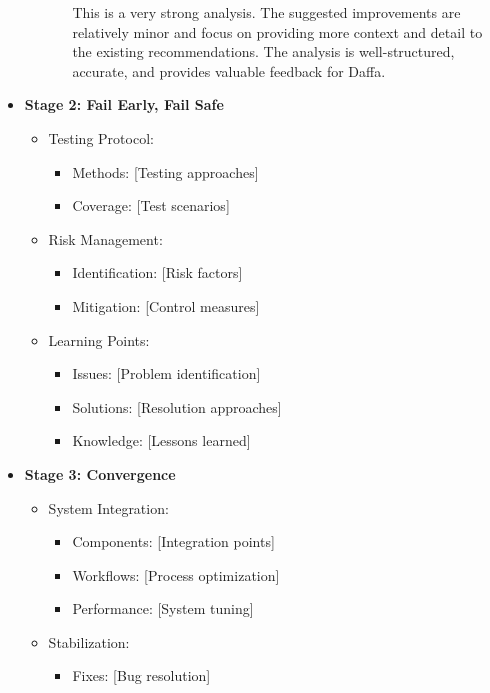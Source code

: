 \documentclass{article}
\begin{document}
\begin{itemize}
\begin{itemize}
\begin{itemize}
This is a very strong analysis. The suggested improvements are relatively minor and focus on providing more context and detail to the existing recommendations. The analysis is well-structured, accurate, and provides valuable feedback for Daffa.
        \end{itemize}
    \end{itemize}
    \item \textbf{Stage 2: Fail Early, Fail Safe}
    \begin{itemize}
        \item Testing Protocol:
        \begin{itemize}
            \item Methods: [Testing approaches]
            \item Coverage: [Test scenarios]
        \end{itemize}
        \item Risk Management:
        \begin{itemize}
            \item Identification: [Risk factors]
            \item Mitigation: [Control measures]
        \end{itemize}
        \item Learning Points:
        \begin{itemize}
            \item Issues: [Problem identification]
            \item Solutions: [Resolution approaches]
            \item Knowledge: [Lessons learned]
        \end{itemize}
    \end{itemize}
    \item \textbf{Stage 3: Convergence}
    \begin{itemize}
        \item System Integration:
        \begin{itemize}
            \item Components: [Integration points]
            \item Workflows: [Process optimization]
            \item Performance: [System tuning]
        \end{itemize}
        \item Stabilization:
        \begin{itemize}
            \item Fixes: [Bug resolution]

\end{itemize}
\end{itemize}
\end{itemize}
\end{document}
